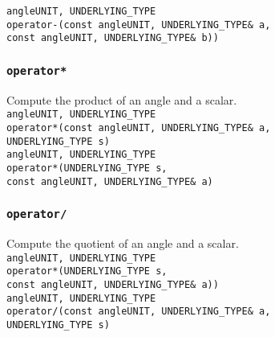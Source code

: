\documentclass[oneside]{book}
\begin{document}
\noindent\texttt{angle\textlangle UNIT, UNDERLYING\_TYPE\textrangle}\\
\texttt{operator-}\texttt{(}\texttt{const angle\textlangle UNIT, UNDERLYING\_TYPE\textrangle\& a}\texttt{,}\\
\texttt{const angle\textlangle UNIT, UNDERLYING\_TYPE\textrangle\& b)}\texttt{)}\\

\subsubsection{\texttt{operator*}}
Compute the product of an angle and a scalar.\\

\noindent\texttt{angle\textlangle UNIT, UNDERLYING\_TYPE\textrangle}\\
\texttt{operator*}\texttt{(}\texttt{const angle\textlangle UNIT, UNDERLYING\_TYPE\textrangle\& a}\texttt{,}\\
\texttt{UNDERLYING\_TYPE s}\texttt{)}\\

\noindent{}\texttt{angle\textlangle UNIT, UNDERLYING\_TYPE\textrangle}\\
\texttt{operator*}\texttt{(}\texttt{UNDERLYING\_TYPE s}\texttt{,}\\
\texttt{const angle\textlangle UNIT, UNDERLYING\_TYPE\textrangle\& a}\texttt{)}\\

\subsubsection{\texttt{operator/}}
Compute the quotient of an angle and a scalar.\\

\noindent\texttt{angle\textlangle UNIT, UNDERLYING\_TYPE\textrangle}\\
\texttt{operator*}\texttt{(}\texttt{UNDERLYING\_TYPE s}\texttt{,}\\
\texttt{const angle\textlangle UNIT, UNDERLYING\_TYPE\textrangle\& a)}\texttt{)}\\

\noindent\texttt{angle\textlangle UNIT, UNDERLYING\_TYPE\textrangle}\\
\texttt{operator/}\texttt{(}\texttt{const angle\textlangle UNIT, UNDERLYING\_TYPE\textrangle\& a}\texttt{,}\\
\texttt{UNDERLYING\_TYPE s)}\\
\end{document}
